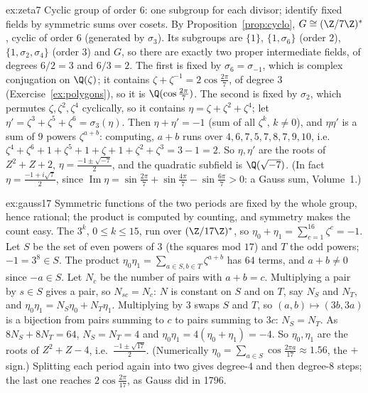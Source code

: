 \begin{solution}{ex:zeta7}
\idea Cyclic group of order $6$: one subgroup for each divisor; identify fixed fields by symmetric sums over cosets.
\writeup By Proposition~\ref{prop:cyclo}, $G\cong(\Z/7\Z)^*$, cyclic of order $6$ (generated by $\sigma_3$). Its subgroups are $\{1\}$, $\{1,\sigma_6\}$ (order $2$), $\{1,\sigma_2,\sigma_4\}$ (order $3$) and $G$, so there are exactly two proper intermediate fields, of degrees $6/2=3$ and $6/3=2$. The first is fixed by $\sigma_6=\sigma_{-1}$, which is complex conjugation on $\Q(\zeta)$; it contains $\zeta+\zeta^{-1}=2\cos\frac{2\pi}7$, of degree $3$ (Exercise~\ref{ex:polygons}), so it is $\Q(\cos\frac{2\pi}7)$. The second is fixed by $\sigma_2$, which permutes $\zeta,\zeta^2,\zeta^4$ cyclically, so it contains $\eta=\zeta+\zeta^2+\zeta^4$; let $\eta'=\zeta^3+\zeta^5+\zeta^6=\sigma_3(\eta)$. Then $\eta+\eta'=-1$ (sum of all $\zeta^k$, $k\ne0$), and $\eta\eta'$ is a sum of $9$ powers $\zeta^{a+b}$: computing, $a+b$ runs over $4,6,7,5,7,8,7,9,10$, i.e.\ $\zeta^4+\zeta^6+1+\zeta^5+1+\zeta+1+\zeta^2+\zeta^3=3-1=2$. So $\eta,\eta'$ are the roots of $Z^2+Z+2$, $\eta=\frac{-1\pm\sqrt{-7}}2$, and the quadratic subfield is $\Q(\sqrt{-7})$. (In fact $\eta=\frac{-1+i\sqrt7}2$, since $\operatorname{Im}\eta=\sin\frac{2\pi}7+\sin\frac{4\pi}7-\sin\frac{6\pi}7>0$: a Gauss sum, Volume~1.)
\end{solution}

\begin{solution}{ex:gauss17}
\idea Symmetric functions of the two periods are fixed by the whole group, hence rational; the product is computed by counting, and symmetry makes the count easy.
\writeup The $3^k$, $0\le k\le15$, run over $(\Z/17\Z)^*$, so $\eta_0+\eta_1=\sum_{c=1}^{16}\zeta^c=-1$. Let $S$ be the set of even powers of $3$ (the squares mod $17$) and $T$ the odd powers; $-1=3^8\in S$. The product $\eta_0\eta_1=\sum_{a\in S,b\in T}\zeta^{a+b}$ has $64$ terms, and $a+b\ne0$ since $-a\in S$. Let $N_c$ be the number of pairs with $a+b=c$. Multiplying a pair by $s\in S$ gives a pair, so $N_{sc}=N_c$: $N$ is constant on $S$ and on $T$, say $N_S$ and $N_T$, and $\eta_0\eta_1=N_S\eta_0+N_T\eta_1$. Multiplying by $3$ swaps $S$ and $T$, so $(a,b)\mapsto(3b,3a)$ is a bijection from pairs summing to $c$ to pairs summing to $3c$: $N_S=N_T$. As $8N_S+8N_T=64$, $N_S=N_T=4$ and $\eta_0\eta_1=4(\eta_0+\eta_1)=-4$. So $\eta_0,\eta_1$ are the roots of $Z^2+Z-4$, i.e.\ $\frac{-1\pm\sqrt{17}}2$. (Numerically $\eta_0=\sum_{a\in S}\cos\frac{2\pi a}{17}\approx1.56$, the $+$ sign.) Splitting each period again into two gives degree-$4$ and then degree-$8$ steps; the last one reaches $2\cos\frac{2\pi}{17}$, as Gauss did in 1796.
\end{solution}

